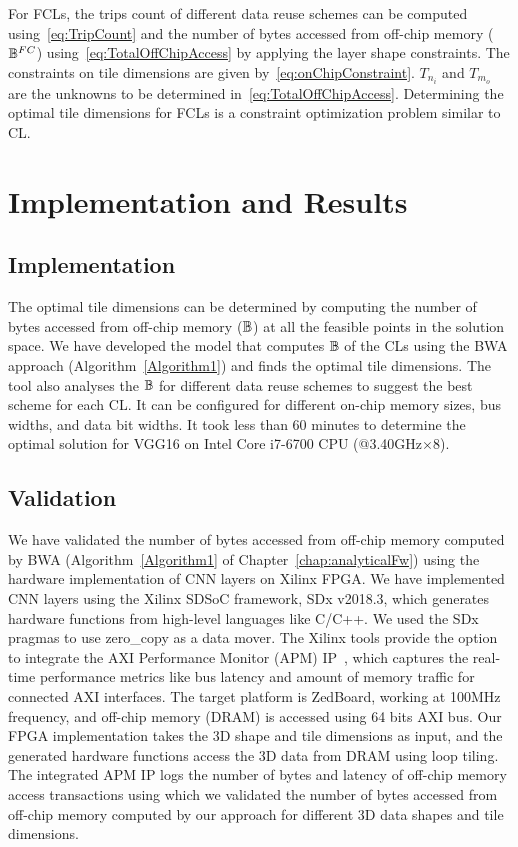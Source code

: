 For FCLs, the trips count of different data reuse schemes can be computed using~\eqref{eq:TripCount} and the number of bytes accessed from off-chip memory ($\mathbb{B}^{FC}$) using~\eqref{eq:TotalOffChipAccess} by applying the layer shape constraints. The constraints on tile dimensions are given by~\eqref{eq:onChipConstraint}. $T_{n_i}$ and $T_{m_o}$ are the unknowns to be determined in~\eqref{eq:TotalOffChipAccess}. Determining the optimal tile dimensions for FCLs is a constraint optimization problem similar to CL.
\section{Implementation and Results}
\subsection{Implementation}
The optimal tile dimensions can be determined by computing the number of bytes accessed from off-chip memory ($\mathbb{B}$) at all the feasible points in the solution space. 
We have developed the model that computes $\mathbb{B}$ of the CLs using the BWA approach (Algorithm~\ref{Algorithm1}) and finds the optimal tile dimensions. The tool also analyses the $\mathbb{B}$ for different data reuse schemes to suggest the best scheme for each CL. It can be configured for different on-chip memory sizes, bus widths, and data bit widths. It took less than 60 minutes to determine the optimal solution for VGG16 on Intel Core i7-6700 CPU (@3.40GHz$\times$8).
\subsection{Validation}\label{Validation}
We have validated the number of bytes accessed from off-chip memory computed by BWA (Algorithm~\ref{Algorithm1} of Chapter~\ref{chap:analyticalFw}) using the hardware implementation of CNN layers on Xilinx FPGA. We have implemented CNN layers using the Xilinx SDSoC framework, SDx v2018.3, which generates hardware functions from high-level languages like C/C++. We used the SDx pragmas to use zero\_copy as a data mover. The Xilinx tools provide the option to integrate the AXI Performance Monitor (APM) IP~\cite{APM}, which captures the real-time performance metrics like bus latency and amount of memory traffic for connected AXI interfaces. The target platform is ZedBoard, working at 100MHz frequency, and off-chip memory (DRAM) is accessed using 64 bits AXI bus. 
Our FPGA implementation takes the 3D shape and tile dimensions as input, and the generated hardware functions access the 3D data from DRAM using loop tiling. The integrated APM IP logs the number of bytes and latency of off-chip memory access transactions using which we validated the number of bytes accessed from off-chip memory computed by our approach for different 3D data shapes and tile dimensions.
